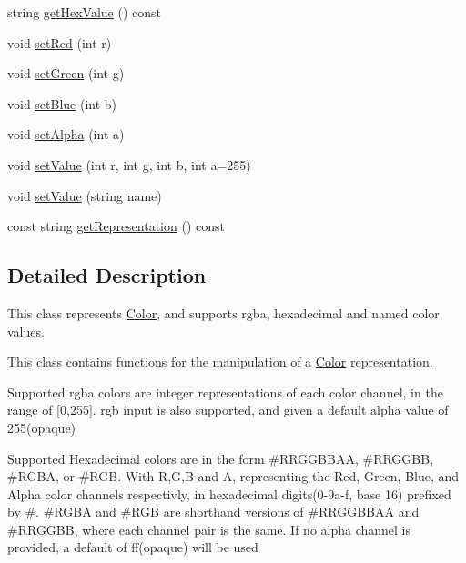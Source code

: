 \begin{DoxyCompactItemize}
\item 
string \hyperlink{classbridges_1_1_color_abdf44b8eb8c79452e38b93c02fb0aa99}{get\+Hex\+Value} () const 
\item 
void \hyperlink{classbridges_1_1_color_a6d7521acce040aca88645f6ad1bf5f44}{set\+Red} (int r)
\item 
void \hyperlink{classbridges_1_1_color_a7689ebb07ae20ad846827e4f42546ba8}{set\+Green} (int g)
\item 
void \hyperlink{classbridges_1_1_color_a3b0e703dd68d7e695664264908e0f709}{set\+Blue} (int b)
\item 
void \hyperlink{classbridges_1_1_color_ab139e842be237a8963d46c6a3edb488d}{set\+Alpha} (int a)
\item 
void \hyperlink{classbridges_1_1_color_a3d6c66d33bd8a702a4436925c9cbd1fd}{set\+Value} (int r, int g, int b, int a=255)
\item 
void \hyperlink{classbridges_1_1_color_aa6e1db9aa47275ef829ac0fa96d72190}{set\+Value} (string name)
\item 
const string \hyperlink{classbridges_1_1_color_a17f1c732f71bc204d17c9e2f0b637074}{get\+Representation} () const 
\end{DoxyCompactItemize}


\subsection{Detailed Description}
This class represents \hyperlink{classbridges_1_1_color}{Color}, and supports rgba, hexadecimal and named color values. 

This class contains functions for the manipulation of a \hyperlink{classbridges_1_1_color}{Color} representation.

Supported rgba colors are integer representations of each color channel, in the range of \mbox{[}0,255\mbox{]}. rgb input is also supported, and given a default alpha value of 255(opaque)

Supported Hexadecimal colors are in the form \#\+R\+R\+G\+G\+B\+B\+A\+A, \#\+R\+R\+G\+G\+B\+B, \#\+R\+G\+B\+A, or \#\+R\+G\+B. With R,G,B and A, representing the Red, Green, Blue, and Alpha color channels respectivly, in hexadecimal digits(0-\/9a-\/f, base 16) prefixed by \textquotesingle{}\#\textquotesingle{}. \#\+R\+G\+B\+A and \#\+R\+G\+B are shorthand versions of \#\+R\+R\+G\+G\+B\+B\+A\+A and \#\+R\+R\+G\+G\+B\+B, where each channel pair is the same. If no alpha channel is provided, a default of \textquotesingle{}ff\textquotesingle{}(opaque) will be used

